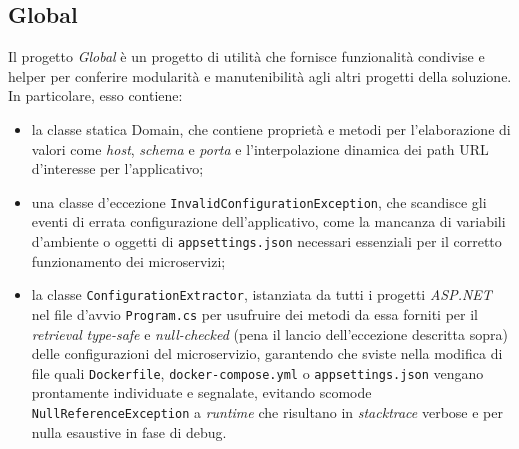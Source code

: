 \subsection{Global}
Il progetto \emph{Global} è un progetto di utilità che fornisce funzionalità condivise e helper per conferire modularità e manutenibilità agli altri progetti della soluzione. In particolare, esso contiene:
\begin{itemize}
        \item la classe statica Domain, che contiene proprietà e metodi per l'elaborazione di valori come \emph{host}, \emph{schema} e \emph{porta} e l'interpolazione dinamica dei path URL d'interesse per l'applicativo;
        \item una classe d'eccezione \texttt{InvalidConfigurationException}, che scandisce gli eventi di errata configurazione dell'applicativo, come la mancanza di variabili d'ambiente o oggetti di \texttt{appsettings.json} necessari essenziali per il corretto funzionamento dei microservizi;
        \item la classe \texttt{ConfigurationExtractor}, istanziata da tutti i progetti \emph{ASP.NET} nel file d'avvio \texttt{Program.cs} per usufruire dei metodi da essa forniti per il \emph{retrieval} \emph{type-safe} e \emph{null-checked} (pena il lancio dell'eccezione descritta sopra) delle configurazioni del microservizio, garantendo che sviste nella modifica di file quali \texttt{Dockerfile}, \texttt{docker-compose.yml} o \texttt{appsettings.json} vengano prontamente individuate e segnalate, evitando scomode \texttt{NullReferenceException} a \emph{runtime} che risultano in \emph{stacktrace} verbose e per nulla esaustive in fase di debug.
\end{itemize}

